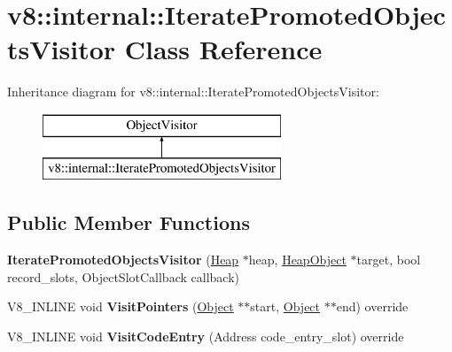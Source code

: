 \hypertarget{classv8_1_1internal_1_1_iterate_promoted_objects_visitor}{}\section{v8\+:\+:internal\+:\+:Iterate\+Promoted\+Objects\+Visitor Class Reference}
\label{classv8_1_1internal_1_1_iterate_promoted_objects_visitor}
Inheritance diagram for v8\+:\+:internal\+:\+:Iterate\+Promoted\+Objects\+Visitor\+:\begin{figure}[H]
\begin{center}
\leavevmode
\includegraphics[height=2.000000cm]{classv8_1_1internal_1_1_iterate_promoted_objects_visitor}
\end{center}
\end{figure}
\subsection*{Public Member Functions}
\begin{DoxyCompactItemize}
\item 
{\bfseries Iterate\+Promoted\+Objects\+Visitor} (\hyperlink{classv8_1_1internal_1_1_heap}{Heap} $\ast$heap, \hyperlink{classv8_1_1internal_1_1_heap_object}{Heap\+Object} $\ast$target, bool record\+\_\+slots, Object\+Slot\+Callback callback)\hypertarget{classv8_1_1internal_1_1_iterate_promoted_objects_visitor_a6ec5ad3b1556e9291748cb595acd1174}{}\label{classv8_1_1internal_1_1_iterate_promoted_objects_visitor_a6ec5ad3b1556e9291748cb595acd1174}

\item 
V8\+\_\+\+I\+N\+L\+I\+NE void {\bfseries Visit\+Pointers} (\hyperlink{classv8_1_1internal_1_1_object}{Object} $\ast$$\ast$start, \hyperlink{classv8_1_1internal_1_1_object}{Object} $\ast$$\ast$end) override\hypertarget{classv8_1_1internal_1_1_iterate_promoted_objects_visitor_a44c79b96e5c9b4a8d44a40f02d058e6e}{}\label{classv8_1_1internal_1_1_iterate_promoted_objects_visitor_a44c79b96e5c9b4a8d44a40f02d058e6e}

\item 
V8\+\_\+\+I\+N\+L\+I\+NE void {\bfseries Visit\+Code\+Entry} (Address code\+\_\+entry\+\_\+slot) override\hypertarget{classv8_1_1internal_1_1_iterate_promoted_objects_visitor_a16410876aaa9b4cf257e1211efe25a63}{}\label{classv8_1_1internal_1_1_iterate_promoted_objects_visitor_a16410876aaa9b4cf257e1211efe25a63}

\end{DoxyCompactItemize}

